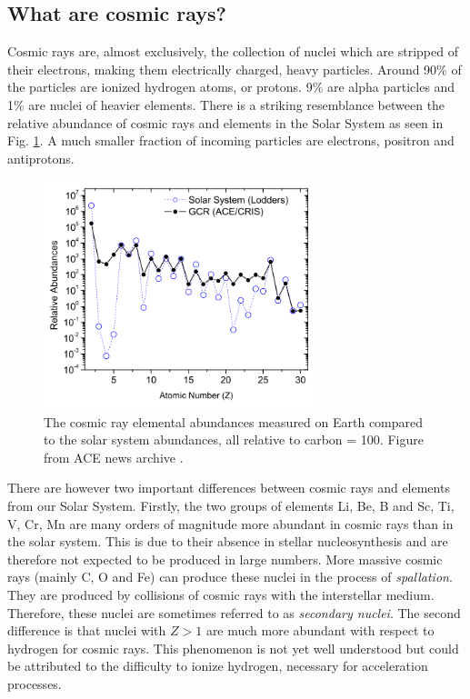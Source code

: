 \subsection{What are cosmic rays?}
\label{subsec:whatarecosmicrays}
Cosmic rays are, almost exclusively, the collection of nuclei which are stripped of their electrons, making them electrically charged, heavy particles. Around 90\% of the particles are ionized hydrogen atoms, or protons. 9\% are alpha particles and 1\% are nuclei of heavier elements. There is a striking resemblance between the relative abundance of cosmic rays and elements in the Solar System as seen in Fig. \ref{fig:relabundance}. A much smaller fraction of incoming particles are electrons, positron and antiprotons.

\begin{figure}
\label{fig:relabundance}
\centering
\includegraphics[width=0.7\textwidth]{./chapter3/img/relativeabundanceACE.png}
\caption{The cosmic ray elemental abundances measured on Earth compared to the solar system abundances, all relative to carbon = 100. Figure from ACE news archive \cite{ISRAEL2005201}.}
\end{figure}
There are however two important differences between cosmic rays and elements from our Solar System. Firstly, the two groups of elements Li, Be, B and Sc, Ti, V, Cr, Mn are many orders of magnitude more abundant in cosmic rays than in the solar system. This is due to their absence in stellar nucleosynthesis and are therefore not expected to be produced in large numbers. More massive cosmic rays (mainly C, O and Fe) can produce these nuclei in the process of \textit{spallation}. They are produced by collisions of cosmic rays with the interstellar medium. Therefore, these nuclei are sometimes referred to as \textit{secondary nuclei}.
The second difference is that nuclei with $Z>1$ are much more abundant with respect to hydrogen for cosmic rays. This phenomenon is not yet well understood but could be attributed to the difficulty to ionize hydrogen, necessary for acceleration processes.

